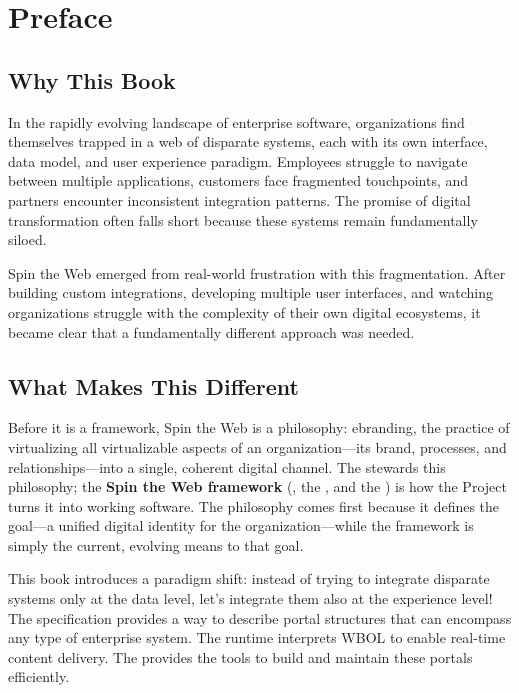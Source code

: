
\chapter*{Preface}

\section*{Why This Book}

In the rapidly evolving landscape of enterprise software, organizations find themselves trapped in a web of disparate systems, each with its own interface, data model, and user experience paradigm. Employees struggle to navigate between multiple applications, customers face fragmented touchpoints, and partners encounter inconsistent integration patterns. The promise of digital transformation often falls short because these systems remain fundamentally siloed.

Spin the Web emerged from real-world frustration with this fragmentation. After building custom integrations, developing multiple user interfaces, and watching organizations struggle with the complexity of their own digital ecosystems, it became clear that a fundamentally different approach was needed.

\section*{What Makes This Different}

Before it is a framework, Spin the Web is a philosophy: \gls{ebranding}, the practice of virtualizing all virtualizable aspects of an organization---its brand, processes, and relationships---into a single, coherent digital channel. The \organization{} stewards this philosophy; the \textbf{Spin the Web framework} (\wbol{}, the \webspinner{}, and the \studio{}) is how the Project turns it into working software. The philosophy comes first because it defines the goal---a unified digital identity for the organization---while the framework is simply the current, evolving means to that goal.

This book introduces a paradigm shift: instead of trying to integrate disparate systems only at the data level, let's integrate them also at the experience level! The \wbol specification provides a way to describe portal structures that can encompass any type of enterprise system. The \webspinner runtime interprets WBOL to enable real-time content delivery. The \studio provides the tools to build and maintain these portals efficiently.

